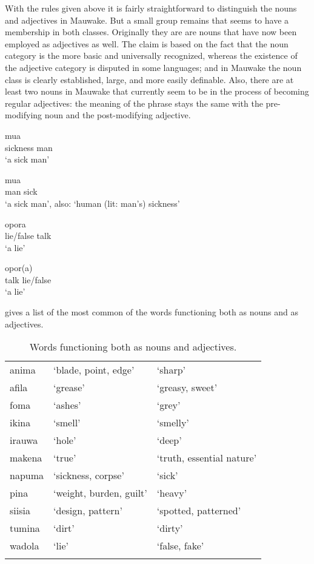 With the rules given above it is fairly straightforward to distinguish the nouns and adjectives in Mauwake. But a small group remains that seems to have a membership in both classes. Originally they are are nouns that have now been employed as adjectives as well. The claim is based on the fact that the noun category is the more basic and universally recognized, whereas the existence of the adjective category is disputed in some languages; and in Mauwake the noun class is clearly established, large, and more easily definable. Also, there are at least two nouns in Mauwake that currently seem to be in the process of becoming regular adjectives: the meaning of the phrase stays the same with the pre-modifying noun and the post-modifying adjective. 

\ea%
\label{ex:3:x107}
\gll {} mua\\
sickness man\\
\glt`a sick man'
\z

\ea%
\label{ex:3:x108}
\gll mua  \\
man sick\\
\glt`a sick man', also: `human (lit: man's) sickness'
\z

\ea%
\label{ex:3:x1822}
\gll {} opora \\
lie/false talk\\
\glt`a lie'
\z

\ea%
\label{ex:3:x1823}
\gll opor(a)  \\
talk lie/false\\
\glt`a lie'
\z

 gives a list of the most common of the words functioning both as nouns and as adjectives.

\begin{table}
 \caption{Words functioning both as nouns and adjectives.}
\label{tab:3:nounadj}

\begin{tabular}{lll} 
\mytoprule
anima &`blade, point, edge' &`sharp'\\
afila &`grease' &`greasy, sweet'\\
foma &`ashes' &`grey'\\
ikina &`smell' &`smelly'\\
irauwa &`hole' &`deep'\\
makena &`true' &`truth, essential nature'\\
napuma &`sickness, corpse' &`sick'\\
pina &`weight, burden, guilt' &`heavy'\\
siisia &`design, pattern' &`spotted, patterned'\\
tumina &`dirt' &`dirty'\\
wadola &`lie' &`false, fake'\\
\mybottomrule
\end{tabular} 

\end{table}
